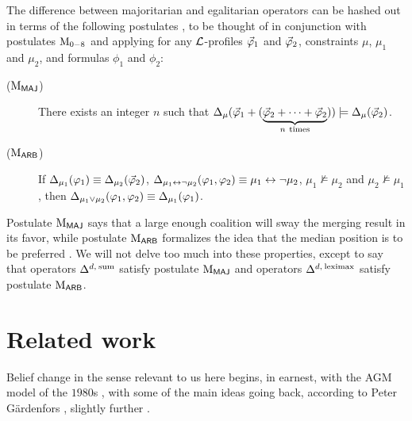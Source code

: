 The difference between majoritarian and egalitarian operators can be hashed out in 
terms of the following postulates \cite{LiberatoreS98,KoniecznyP11}, 
to be thought of in conjunction with postulates $\ppm{0-8}$
and applying for any $\L$-profiles $\P_1$ and $\P_2$,
constraints $\mu$, $\mu_1$ and $\mu_2$, and formulas $\phi_1$ and $\phi_2$:

\begin{description}
	\item[($\ppm{\MAJ}$)] There exists an integer $n$ such that 
		$\me_{\mu}(\P_1+(\underbrace{\P_2+\dots+\P_2}_{n~\text{times}}))\models \me_{\mu}(\P_2)$. 
	\item[($\ppm{\ARB}$)] If $\me_{\mu_1}(\phi_1)\equiv \me_{\mu_2}(\P_2)$,
		$\me_{\mu_1\leftrightarrow\lnot\mu_2}(\phi_1,\phi_2)\equiv \mu_1\leftrightarrow\lnot\mu_2$,
		$\mu_1\not\models\mu_2$ and $\mu_2\not\models\mu_1$,
		then $\me_{\mu_1\lor\mu_2}(\phi_1,\phi_2)\equiv \me_{\mu_1}(\phi_1)$.
\end{description}

Postulate $\ppm{\MAJ}$ says that a large enough coalition 
will sway the merging result in its favor,
while postulate $\ppm{\ARB}$ formalizes the idea that 
the median position is to be preferred \cite{LiberatoreS98}.
We will not delve too much into these properties, 
except to say that operators $\me^{\dd,\:\ssum}$ satisfy postulate $\ppm{\MAJ}$
and operators $\me^{\dd,\:\leximax}$ satisfy postulate $\ppm{\ARB}$.































\section{Related work}\label{sec:3-rw}
Belief change in the sense relevant to us here 
begins, in earnest, with the AGM model of the $1980$s
\cite{AlchourronGM85,AlchourronM85,Gardenfors88},
with some of the main ideas going back,
according to Peter G\"ardenfors \cite{Gardenfors11},
slightly further \cite{Harper76,Levi80}. 

